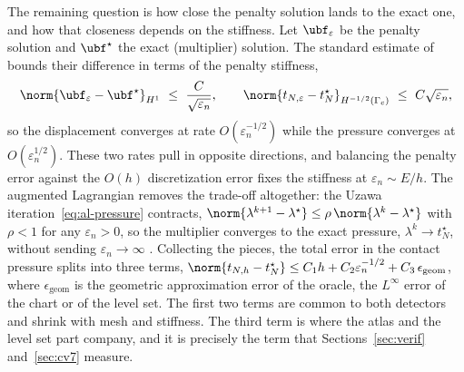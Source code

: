The remaining question is how close the penalty solution lands to the exact one, and how that closeness
depends on the stiffness. Let $\ubf_\varepsilon$ be the penalty solution and $\ubf^\star$ the exact
(multiplier) solution. The standard estimate of \citet{kikuchi1988contact} bounds their difference in
terms of the penalty stiffness,
\begin{equation}\label{eq:penalty-estimate}
\norm{\ubf_{\varepsilon}-\ubf^\star}_{H^1}\ \le\ \frac{C}{\sqrt{\varepsilon_n}},
\qquad
\norm{t_{N,\varepsilon}-t_N^\star}_{H^{-1/2}(\Gamma_c)}\ \le\ C\sqrt{\varepsilon_n},
\end{equation}
so the displacement converges at rate $O(\varepsilon_n^{-1/2})$ while the pressure converges at
$O(\varepsilon_n^{1/2})$. These two rates pull in opposite directions, and balancing the penalty error
against the $O(h)$ discretization error fixes the stiffness at $\varepsilon_n\sim E/h$. The augmented
Lagrangian removes the trade-off altogether: the Uzawa iteration~\eqref{eq:al-pressure} contracts,
$\norm{\lambda^{k+1}-\lambda^\star}\le\rho\,\norm{\lambda^{k}-\lambda^\star}$ with $\rho<1$ for any
$\varepsilon_n>0$, so the multiplier converges to the exact pressure, $\lambda^k\to t_N^\star$, without
sending $\varepsilon_n\to\infty$ \citep{alart1991mixed,simo1992augmented}. Collecting the pieces, the
total error in the contact pressure splits into three terms,
$\norm{t_{N,h}-t_N^\star}\le C_1 h + C_2\varepsilon_n^{-1/2}+C_3\,\epsilon_{\mathrm{geom}}$, where
$\epsilon_{\mathrm{geom}}$ is the geometric approximation error of the oracle, the $L^\infty$ error of
the chart or of the level set. The first two terms are common to both detectors and shrink with mesh
and stiffness. The third term is where the atlas and the level set part company, and it is precisely
the term that Sections~\ref{sec:verif} and~\ref{sec:cv7} measure.
